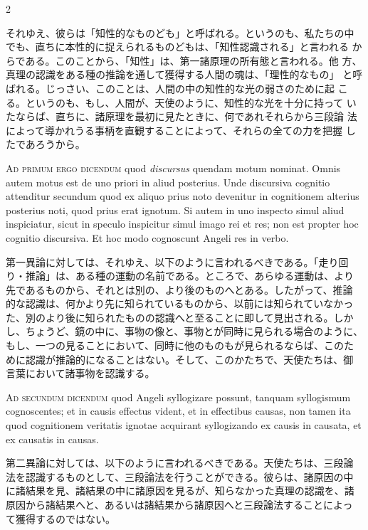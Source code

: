 \documentclass[paper=a4paper,fontsize=10pt,jafontsize=9pt,titlepage]{jlreq}
\begin{document}
\begin{paracol}{2}
\switchcolumn

それゆえ、彼らは「知性的なものども」と呼ばれる。というのも、私たちの中
でも、直ちに本性的に捉えられるものどもは、「知性認識される」と言われる
からである。このことから、「知性」は、第一諸原理の所有態と言われる。他
方、真理の認識をある種の推論を通して獲得する人間の魂は、「理性的なもの」
と呼ばれる。じっさい、このことは、人間の中の知性的な光の弱さのために起
こる。というのも、もし、人間が、天使のように、知性的な光を十分に持って
いたならば、直ちに、諸原理を最初に見たときに、何であれそれらから三段論
法によって導かれうる事柄を直観することによって、それらの全ての力を把握
したであろうから。

\switchcolumn*

{\scshape Ad primum ergo dicendum} quod {\itshape discursus}
quendam motum nominat. Omnis autem motus est de uno priori in aliud
posterius. Unde discursiva cognitio attenditur secundum quod ex aliquo
prius noto devenitur in cognitionem alterius posterius noti, quod prius
erat ignotum. Si autem in uno inspecto simul aliud inspiciatur, sicut
in speculo inspicitur simul imago rei et res; non est propter hoc
cognitio discursiva. Et hoc modo cognoscunt Angeli res in verbo.

\switchcolumn

第一異論に対しては、それゆえ、以下のように言われるべきである。「走り回
り・推論」は、ある種の運動の名前である。ところで、あらゆる運動は、より
先であるものから、それとは別の、より後のものへとある。したがって、推論
的な認識は、何かより先に知られているものから、以前には知られていなかっ
た、別のより後に知られたものの認識へと至ることに即して見出される。しか
し、ちょうど、鏡の中に、事物の像と、事物とが同時に見られる場合のように、
もし、一つの見ることにおいて、同時に他のものもが見られるならば、このた
めに認識が推論的になることはない。そして、このかたちで、天使たちは、御
言葉において諸事物を認識する。

\switchcolumn*

{\scshape Ad secundum dicendum} quod Angeli syllogizare
possunt, tanquam syllogismum cognoscentes; et in causis effectus
vident, et in effectibus causas, non tamen ita quod cognitionem
veritatis ignotae acquirant syllogizando ex causis in causata, et ex
causatis in causas.

\switchcolumn

第二異論に対しては、以下のように言われるべきである。天使たちは、三段論
法を認識するものとして、三段論法を行うことができる。彼らは、諸原因の中
に諸結果を見、諸結果の中に諸原因を見るが、知らなかった真理の認識を、諸
原因から諸結果へと、あるいは諸結果から諸原因へと三段論法することによっ
て獲得するのではない。


\end{paracol}
\end{document}
